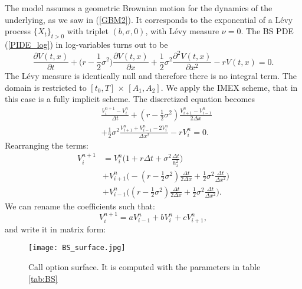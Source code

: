 The \cite{BS73} model assumes a geometric Brownian motion for the dynamics of the underlying, as we saw in (\ref{GBM2}).
It corresponds to the exponential of a Lévy process $\{X_t\}_{t>0}$ with triplet $(b,\sigma,0)$, with Lévy measure $\nu = 0$.
The BS PDE (\ref{PIDE_log}) in log-variables turns out to be
\begin{equation}\label{BS_PDE}
\frac{\partial  V(t,x)}{\partial t}  
          + \biggl( r -\frac{1}{2}\sigma^2 \biggr) \frac{\partial V(t,x)}{\partial x}
          + \frac{1}{2} \sigma^2 \frac{\partial^2  V(t,x)}{\partial x^2} - r  V(t,x)  = 0.
\end{equation}
The Lévy measure is identically null and therefore there is no integral term.
The domain is restricted to $[t_0,T]\, \times \, [A_1,A_2]$. We apply the IMEX scheme, that in this case is a fully implicit scheme.  
The discretized equation becomes
\begin{align}
&\frac{V^{n+1}_{i} -V^{n}_{i}}{\Delta t} + 
(r-\frac{1}{2}\sigma^2) \frac{V^{n}_{i+1} -V^{n}_{i-1}}{ 2 \Delta x} \\ \nonumber
&+ \frac{1}{2} \sigma^2 \frac{V^{n}_{i+1} + V^{n}_{i-1} - 2 V^{n}_{i}}{\Delta x^2}  - r V^{n}_i = 0.
\end{align}
Rearranging the terms: 
\begin{align*}
 V^{n+1}_{i} &= V^{n}_{i} \biggl( 1 + r\Delta t + \sigma^2 \frac{\Delta t}{h_x^2} \biggr)  \\
& + V^{n}_{i+1} \biggl( -(r -\frac{1}{2}\sigma^2)\frac{\Delta t}{2 \Delta x} +
\frac{1}{2}\sigma^2 \frac{\Delta t}{\Delta x^2}  \biggr)  \\
& + V^{n}_{i-1} \biggl( (r -\frac{1}{2}\sigma^2)\frac{\Delta t}{2 \Delta x} + 
\frac{1}{2}\sigma^2 \frac{\Delta t}{\Delta x^2}  \biggr).
\end{align*}
We can rename the coefficients such that:
$$ V^{n+1}_{i} = a V^{n}_{i-1} + b V^{n}_{i} + c V^{n}_{i+1}, $$
and write it in matrix form:
\begin{figure}[t]
   \centering
   \texttt{[image: BS\_surface.jpg]}
   \caption{Call option surface. It is computed with the parameters in table \ref{tab:BS}}
   \label{BS_surface} 
\end{figure}
